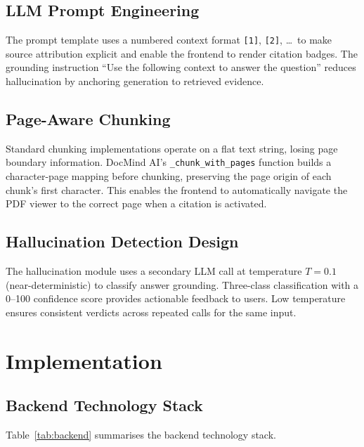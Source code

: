 \documentclass[conference]{IEEEtran}
\begin{document}
\subsection{LLM Prompt Engineering}
The prompt template uses a numbered context format \texttt{[1]},
\texttt{[2]}, \ldots\ to make source attribution explicit and enable the
frontend to render citation badges.
The grounding instruction ``Use the following context to answer the
question'' reduces hallucination by anchoring generation to retrieved
evidence.

\subsection{Page-Aware Chunking}
Standard chunking implementations operate on a flat text string, losing
page boundary information.
DocMind AI's \texttt{\_chunk\_with\_pages} function builds a
character-page mapping before chunking, preserving the page origin of
each chunk's first character.
This enables the frontend to automatically navigate the PDF viewer to
the correct page when a citation is activated.

\subsection{Hallucination Detection Design}
The hallucination module uses a secondary LLM call at temperature
$T=0.1$ (near-deterministic) to classify answer grounding.
Three-class classification with a 0--100 confidence score provides
actionable feedback to users.
Low temperature ensures consistent verdicts across repeated calls for
the same input.

\section{Implementation}
\label{sec:impl}

\subsection{Backend Technology Stack}
Table~\ref{tab:backend} summarises the backend technology stack.
\end{document}
